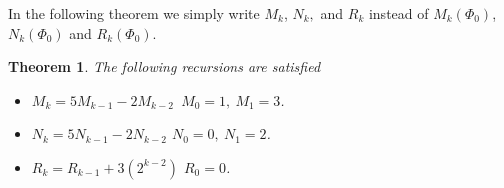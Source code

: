 \documentclass{article}
\newtheorem{theorem}{Theorem}[section]   %
\begin{document}
In the following theorem we simply write $M_k$, $N_k,$ and $R_k$ instead of $M_k(\Phi_0)$, $N_k(\Phi_0)$ and $R_k(\Phi_0)$. 

\begin{theorem}\label{phi0recursions}
The following recursions are satisfied

\begin{itemize}
    \item $M_k = 5M_{k-1} - 2M_{k-2} $\ $M_0 = 1, \ M_1 = 3$.
    \item $N_k = 5N_{k-1} -  2N_{k-2}$ $N_0 = 0, \ N_1 = 2$.
    \item $R_k = R_{k-1} + 3(2^{k-2})$ $R_0 = 0$.
\end{itemize}
\end{theorem}
\end{document}
